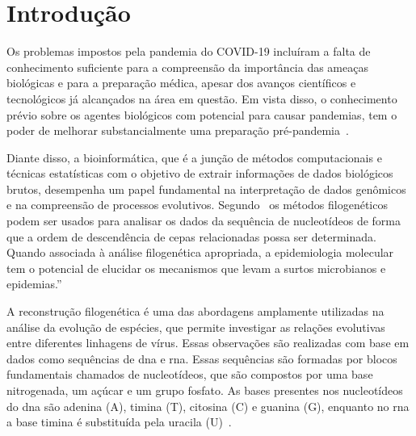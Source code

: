 
\chapter{Introdução}

\setlength{\parskip}{0.3cm}

Os problemas impostos pela pandemia do COVID-19 incluíram a falta de conhecimento suficiente para a compreensão da importância das ameaças biológicas e para a preparação médica, apesar dos avanços científicos e tecnológicos já alcançados na área em questão. Em vista disso, o conhecimento prévio sobre os agentes biológicos com potencial para causar pandemias, tem o poder de melhorar substancialmente uma preparação pré-pandemia~\cite{behl_threat_2022}.

Diante disso, a bioinformática, que é a junção de métodos computacionais e técnicas estatísticas com o objetivo de extrair informações de dados biológicos brutos, desempenha um papel fundamental na interpretação de dados genômicos e na compreensão de processos evolutivos. %
Segundo~\citeauthor{barry_phylogenetic_analysis_2006} os métodos filogenéticos podem ser usados para analisar os dados da sequência de nucleotídeos de forma que a ordem de descendência de cepas relacionadas possa ser determinada. Quando associada à análise filogenética apropriada, a epidemiologia molecular tem o potencial de elucidar os mecanismos que levam a surtos microbianos e epidemias.''

A reconstrução filogenética é uma das abordagens amplamente utilizadas na análise da evolução de espécies, que permite investigar as relações evolutivas entre diferentes linhagens de vírus. Essas observações são realizadas com base em dados como sequências de \gls{dna} e \gls{rna}. Essas sequências são formadas por blocos fundamentais chamados de nucleotídeos, que são compostos por uma base nitrogenada, um açúcar e um grupo fosfato. As bases presentes nos nucleotídeos do \gls{dna} são adenina (A), timina (T), citosina (C) e guanina (G), enquanto no \gls{rna} a base timina é substituída pela uracila (U)~\cite{alberts_molecular_2002}.

